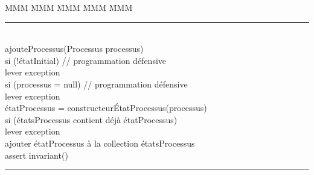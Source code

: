 \documentclass[11pt,article]{article}
\begin{document}
\begin{tabbing}
MMM \= MMM \= MMM \= MMM \= MMM \kill
\rule{12cm}{0.2mm} \\
\textsf{\large ajouteProcessus(Processus processus)} \\
\> si (!étatInitial) // programmation défensive\\
\> \> lever exception\\
\> si (processus = null) // programmation défensive\\
\> \> lever exception\\
\> étatProcessus = constructeurÉtatProcessus(processus)\\
\> si (étatsProcessus contient déjà étatProcessus)\\
\> \> lever exception\\
\> ajouter étatProcessus à la collection étatsProcessus\\
\> assert invariant()\\
\rule{12cm}{0.2mm}
\end{tabbing}
\end{document}
